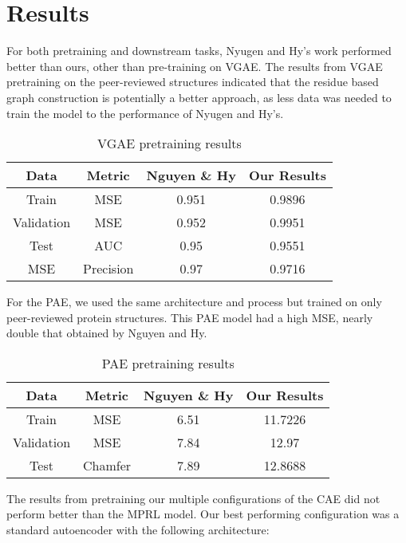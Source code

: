 \documentclass{article}
\begin{document}
\section{Results}
For both pretraining and downstream tasks, Nyugen and Hy’s work performed better than ours, other than pre-training on VGAE. The results from VGAE pretraining on the peer-reviewed structures indicated that the residue based graph construction is potentially a better approach, as less data was needed to train the model to the performance of Nyugen and Hy’s.

\begin{table}[h]
    \centering
    \begin{tabular}{|c | c | c | c|} 
 \hline
 \bf{Data} & \bf{Metric} & \bf{Nguyen \& Hy} & \bf{Our Results} \\ [0.5ex] 
 \hline
 Train & MSE & 0.951 & 0.9896 \\ 
 \hline
 Validation & MSE & 0.952 & 0.9951 \\
 \hline
 Test & AUC & 0.95 & 0.9551 \\
 \hline
 MSE & Precision & 0.97 & 0.9716 \\
 \hline
\end{tabular}
    \caption{VGAE pretraining results}
    \label{tab:VGAE_results}
\end{table}

For the PAE, we used the same architecture and process but trained on only peer-reviewed protein structures. This PAE model had a high MSE, nearly double that obtained by Nguyen and Hy.

\begin{table}[h]
    \centering
    \begin{tabular}{|c  c  c  c|} 
 \hline
 \bf{Data} & \bf{Metric} & \bf{Nguyen \& Hy} & \bf{Our Results} \\ 
 \hline
 Train & MSE & 6.51 & 11.7226 \\ 
 \hline
 Validation & MSE & 7.84 & 12.97 \\
 \hline
 Test & Chamfer & 7.89 & 12.8688 \\
 \hline
\end{tabular}
    \caption{PAE pretraining results}
    \label{tab:PAE_results}
\end{table}

The results from pretraining our multiple configurations of the CAE did not perform better than the MPRL model. Our best performing configuration was a standard autoencoder with the following architecture: 
\end{document}
